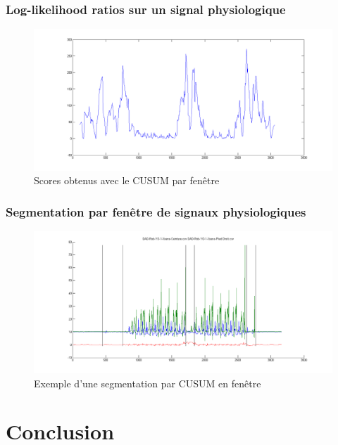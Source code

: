 \documentclass{beamer}
\begin{document}
\begin{frame}
	\frametitle{Log-likelihood ratios sur un signal physiologique}
	\begin{figure}
		\includegraphics[scale=0.3]{win_llr.png}
		\caption{Scores obtenus avec le CUSUM par fenêtre}
	\end{figure}
\end{frame}

\begin{frame}
	\frametitle{Segmentation par fenêtre de signaux physiologiques}
	\begin{figure}
		\includegraphics[scale=0.3]{seg_win.png}
		\caption{Exemple d'une segmentation par CUSUM en fenêtre}
	\end{figure}
\end{frame}



\section{Conclusion}
\end{document}
